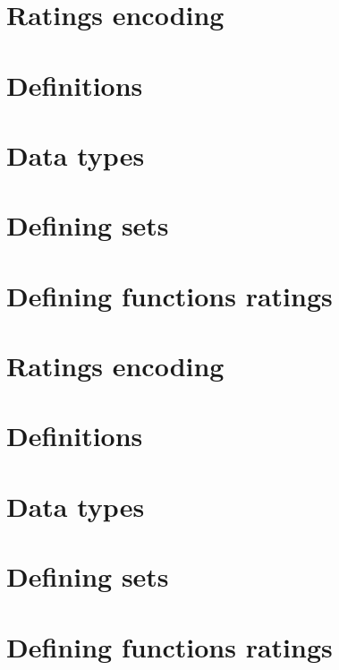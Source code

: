 
\section*{Ratings encoding}

\vfill
\section*{Definitions}

\vfill
\section*{Data types}

\vfill
\section*{Defining sets}

\vfill
\section*{Defining functions ratings}

\vfill
\section*{Ratings encoding}

\vfill
\section*{Definitions}

\vfill
\section*{Data types}

\vfill
\section*{Defining sets}

\vfill
\section*{Defining functions ratings}

\vfill
